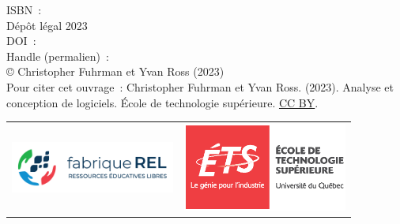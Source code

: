 

ISBN~: \\
Dépôt légal 2023 \\
DOI~: \\
Handle (permalien)~: \\
© Christopher Fuhrman et Yvan Ross (2023)\\
Pour citer cet ouvrage~: Christopher Fuhrman et Yvan Ross. (2023). Analyse et conception de logiciels.
École de technologie supérieure. \href{https://creativecommons.org/licenses/by/4.0/deed.fr}{CC BY}.


\vfill
\begin{tabular}{m{2.5in}m{2.5in}}
\includegraphics[width=2.125in]{images/F-REL_logo-coul-horiz.png} &
\includegraphics[width=2.125in]{images/Logo_ETS_TypoGrise_D_FR.eps}\\
\end{tabular}
\normalsize